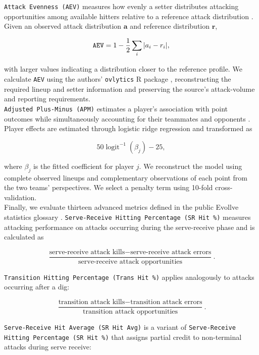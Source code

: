 \documentclass[10pt]{article}
\begin{document}
\texttt{Attack Evenness (AEV)} measures how evenly a setter distributes attacking opportunities among available hitters relative to a reference attack distribution \citep{raymond_attack_2024}.
Given an observed attack distribution $\mathbf{a}$ and reference distribution $\mathbf{r}$,

\[
\text{\texttt{AEV}}
=
1-\frac{1}{2}\sum_i |a_i-r_i|,
\]

with larger values indicating a distribution closer to the reference profile.
We calculate \texttt{AEV} using the authors' \texttt{ovlytics} R package \citep{raymond_ovlytics_2024}, reconstructing the required lineup and setter information and preserving the source's attack-volume and reporting requirements. \\

\texttt{Adjusted Plus-Minus (APM)} estimates a player's association with point outcomes while simultaneously accounting for their teammates and opponents \citep{hass_exploring_2018}.
Player effects are estimated through logistic ridge regression and transformed as

\[
50\operatorname{logit}^{-1}(\beta_j)-25,
\]

where $\beta_j$ is the fitted coefficient for player $j$.
We reconstruct the model using complete observed lineups and complementary observations of each point from the two teams' perspectives.
We select a penalty term using 10-fold cross-validation. \\


Finally, we evaluate thirteen advanced metrics defined in the public Evollve statistics glossary \citep{evollve_glossary_2026}.
\texttt{Serve-Receive Hitting Percentage (SR Hit \%)} measures attacking performance on attacks occurring during the serve-receive phase and is calculated as

\[
\frac{
\text{serve-receive attack kills}-\text{serve-receive attack errors}
}{
\text{serve-receive attack opportunities}
}.
\]

\texttt{Transition Hitting Percentage (Trans Hit \%)} applies analogously to attacks occurring after a dig:

\[
\frac{
\text{transition attack kills}-\text{transition attack errors}
}{
\text{transition attack opportunities}
}.
\]

\texttt{Serve-Receive Hit Average (SR Hit Avg)} is a variant of \texttt{Serve-Receive Hitting Percentage (SR Hit \%)} that assigns partial credit to non-terminal attacks during serve receive:
\end{document}
